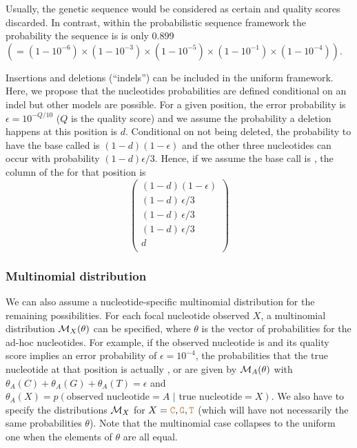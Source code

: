 \documentclass[10pt]{article}
\begin{document}
Usually, the genetic sequence  would be considered as certain and quality scores discarded. In contrast, within the probabilistic sequence framework the probability the sequence is  is only 0.899 ${\displaystyle(=(1-10^{-6})\times (1-10^{-3})\times (1-10^{-5})\times (1-10^{-1})\times (1-10^{-4}))}$.

Insertions and deletions (``indels'') can be included in the uniform framework. Here, we propose that the nucleotides probabilities are defined conditional on an indel but other models are possible. 
For a given position, the error probability is $\epsilon = 10^{-Q/10}$ ($Q$ is the quality score) and we assume the probability a deletion happens at this position is $d$.  Conditional on not being deleted, the probability to have the base called is $(1-d)(1-\epsilon)$ and the other three nucleotides can occur with probability $(1-d)\epsilon/3$. 
Hence, if we assume the base call is , the column of the \nlps for that position is
\begin{equation}
\begin{pmatrix}
(1-d)(1-\epsilon)  \\
(1-d)\,\epsilon / 3  \\
(1-d)\,\epsilon / 3  \\
(1-d)\,\epsilon / 3  \\
d\\
\end{pmatrix}
\label{eq:deletion}
\end{equation}


\subsubsection*{Multinomial distribution} 
We can also assume a nucleotide-specific multinomial distribution for the remaining possibilities. For each focal nucleotide observed $X$, a multinomial distribution $\mathcal{M}_X(\theta)$ can be specified, where $\theta$ is the vector of probabilities for the ad-hoc nucleotides.
For example, if the observed nucleotide is  and its quality score implies an error probability of $\epsilon = 10^{-4}$, the probabilities that the true nucleotide at that position is actually ,  or  are given by $\mathcal{M}_A(\theta)$ with $\theta_A(C) + \theta_A(G) + \theta_A(T) = \epsilon$ and $\theta_A(X) = p(\text{observed nucleotide} = A \,\,|\,\, \text{true nucleotide} = X )$.
We also have to specify the distributions $\mathcal{M}_X$ for $X=\texttt{\textcolor{brown}{C}},\texttt{\textcolor{brown}{G}},\texttt{\textcolor{brown}{T}}$ (which will have not necessarily the same probabilities $\theta$).
Note that the multinomial case collapses to the uniform one when the elements of $\theta$ are all equal.
\end{document}
